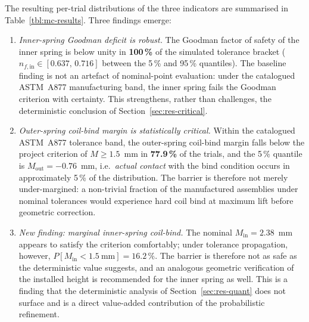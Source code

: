 The resulting per-trial distributions of the three indicators are
summarised in Table~\ref{tbl:mc-results}. Three findings emerge:

\begin{enumerate}
\item \emph{Inner-spring Goodman deficit is robust.} The Goodman
factor of safety of the inner spring is below unity in
\textbf{100\,\%} of the simulated tolerance bracket
($n_{f,\mathrm{in}}\in[0.637,\,0.716]$ between the 5\,\% and 95\,\%
quantiles). The baseline finding is not an artefact of nominal-point
evaluation: under the catalogued ASTM~A877 manufacturing band, the
inner spring fails the Goodman criterion with certainty. This
strengthens, rather than challenges, the deterministic conclusion of
Section~\ref{sec:res-critical}.
\item \emph{Outer-spring coil-bind margin is statistically critical.}
Within the catalogued ASTM~A877 tolerance band, the outer-spring
coil-bind margin falls below the project criterion of
$M\geq 1.5$~mm in \textbf{77.9\,\%} of the trials, and the 5\,\%
quantile is $M_{\mathrm{out}}=-0.76$~mm, i.e.\ \emph{actual contact}
with the bind condition occurs in approximately 5\,\% of the
distribution. The barrier is therefore not merely under-margined: a
non-trivial fraction of the manufactured assemblies under nominal
tolerances would experience hard coil bind at maximum lift before
geometric correction.
\item \emph{New finding: marginal inner-spring coil-bind.} The
nominal $M_{\mathrm{in}}=2.38$~mm appears to satisfy the criterion
comfortably; under tolerance propagation, however,
$P[M_{\mathrm{in}}<1.5~\mathrm{mm}]=16.2\,\%$. The barrier is
therefore not as safe as the deterministic value suggests, and an
analogous geometric verification of the installed height is
recommended for the inner spring as well. This is a finding that the
deterministic analysis of Section~\ref{sec:res-quant} does not
surface and is a direct value-added contribution of the probabilistic
refinement.
\end{enumerate}

